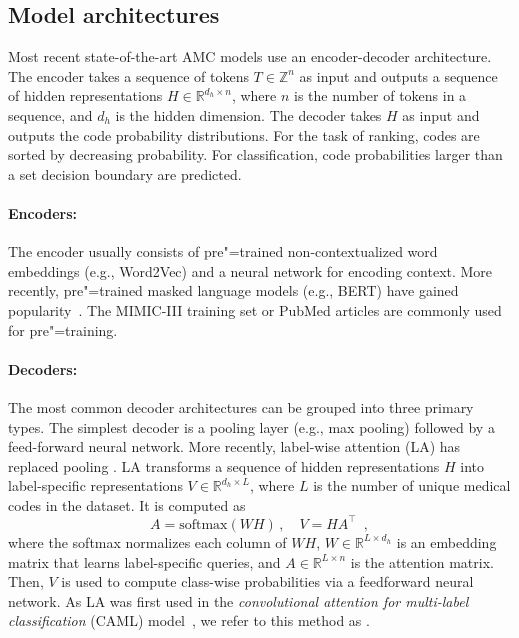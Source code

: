 {\subsection{Model architectures}

Most recent state-of-the-art AMC models use an encoder-decoder architecture. The encoder takes a sequence of tokens $T \in \mathbb{Z}^{n}$ as input and outputs a sequence of hidden representations $H \in \mathbb{R}^{d_h \times n}$, where $n$ is the number of tokens in a sequence, and $d_h$ is the hidden dimension. The decoder takes $H$ as input and outputs the code probability distributions. For the task of ranking, codes are sorted by decreasing probability. For classification, code probabilities larger than a set decision boundary are predicted. 

\paragraph{Encoders:}
The encoder usually consists of pre"=trained non-contextualized word embeddings (e.g., Word2Vec) and a neural network for encoding context. More recently, pre"=trained masked language models (e.g., BERT) have gained popularity~\parencite{tengReviewDeepNeural2022}. The MIMIC-III training set or PubMed articles are commonly used for pre"=training.

\paragraph{Decoders:}
The most common decoder architectures can be grouped into three primary types. 
The simplest decoder is a pooling layer (e.g., max pooling) followed by a feed-forward neural network. More recently, label-wise attention (LA) \parencite{mullenbachExplainablePredictionMedical2018} has replaced pooling \parencite{vuLabelAttentionModel2020, liuEffectiveConvolutionalAttention2021, huangPLMICDAutomaticICD2022, liICDCodingClinical2020}. LA transforms a sequence of hidden representations $H$ into label-specific representations $V \in \mathbb{R}^{d_h \times L}$, where $L$ is the number of unique medical codes in the dataset.
It is computed as
\begin{equation}
    A = \text{softmax}(WH) \, , \quad
    V = HA^{\top} \enspace ,
\end{equation}
where the softmax normalizes each column of $WH$, $W \in \mathbb{R}^{L \times d_h}$ is an embedding matrix that learns label-specific queries, and $A \in \mathbb{R}^{L \times n}$ is the attention matrix. 
Then, $V$ is used to compute class-wise probabilities via a feedforward neural network. 
As LA was first used in the \textit{convolutional attention for multi-label classification} (CAML) model~\parencite{mullenbachExplainablePredictionMedical2018}, we refer to this method as \lacaml.

}
